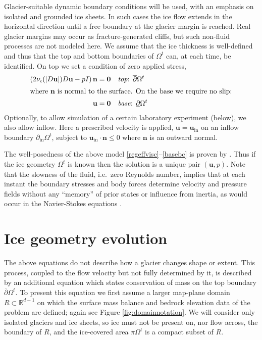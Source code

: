 \documentclass[letterpaper,final,12pt,reqno]{amsart}
\newcommand{\eps}{\epsilon}
\newcommand{\RR}{\mathbb{R}}
\newcommand{\bn}{\mathbf{n}}
\newcommand{\bu}{\mathbf{u}}
\newcommand{\bzero}{\bm{0}}
\begin{document}
Glacier-suitable dynamic boundary conditions will be used, with an emphasis on isolated and grounded ice sheets.  In such cases the ice flow extends in the horizontal direction until a free boundary at the glacier margin is reached.  Real glacier margins may occur as fracture-generated cliffs, but such non-fluid processes are not modeled here.  We assume that the ice thickness is well-defined and thus that the top and bottom boundaries of $\Omega^t$ can, at each time, be identified.  On top we set a condition of zero applied stress,
\begin{align}
\left(2 \nu_\eps(|D\bu|) D\bu - pI\right) \bn &= \bzero  &&\text{\emph{top}: } \overline{\partial} \Omega^t \label{topbc} \\
\intertext{where $\bn$ is normal to the surface.  On the base we require no slip:}
\bu &= \bzero  &&\text{\emph{base}: } \underline{\partial} \Omega^t \label{basebc}
\end{align}
Optionally, to allow simulation of a certain laboratory experiment \cite{SayagWorster2013} (below), we also allow inflow.  Here a prescribed velocity is applied, $\bu = \bu_{\text{in}}$ on an inflow boundary $\partial_{\text{in}} \Omega^t$, subject to $\bu_{\text{in}}\cdot \bn \le 0$ where $\bn$ is an outward normal.

The well-posedness of the above model \eqref{regeffvisc}--\eqref{basebc} is proven by \cite{JouvetRappaz2011}.  Thus if the ice geometry $\Omega^t$ is known then the solution is a unique pair $(\bu,p)$.  Note that the slowness of the fluid, i.e.~zero Reynolds number, implies that at each instant the boundary stresses and body forces determine velocity and pressure fields without any ``memory'' of prior states or influence from inertia, as would occur in the Navier-Stokes equations \cite{Fowler1997}.


\section{Ice geometry evolution} \label{sec:stronggeometry}

The above equations do not describe how a glacier changes shape or extent.  This process, coupled to the flow velocity but not fully determined by it, is described by an additional equation which states conservation of mass on the top boundary $\overline{\partial} \Omega^t$.  To present this equation we first assume a larger map-plane domain $R\subset \RR^{d-1}$ on which the surface mass balance and bedrock elevation data of the problem are defined; again see Figure \ref{fig:domainnotation}.  We will consider only isolated glaciers and ice sheets, so ice must not be present on, nor flow across, the boundary of $R$, and the ice-covered area $\pi\Omega^t$ is a compact subset of $R$.
\end{document}
